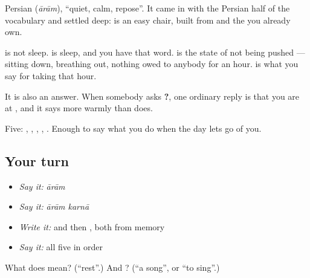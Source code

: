 Persian  (\emph{ārām}), \textquotedblleft{}quiet, calm, repose\textquotedblright{}. It came in with the Persian half of the vocabulary and settled deep: \textbf{} is an easy chair, built from  and the \textbf{} you already own.

 is not sleep. \textbf{} is sleep, and you have that word.  is the state of not being pushed — sitting down, breathing out, nothing owed to anybody for an hour. \textbf{ } is what you say for taking that hour.

It is also an answer. When somebody asks \textbf{  ?}, one ordinary reply is that you are at , and it says more warmly than \textbf{} does.

\begin{grammarlens}[title={What you've built}]
Five: , , , , . Enough to say what you do when the day lets go of you.
\end{grammarlens}

\subsection*{Your turn}
\begin{itemize}
\raggedright
  \item \emph{Say it:} \emph{ārām}
  \item \emph{Say it:} \emph{ārām karnā}
  \item \emph{Write it:}  and then , both from memory
  \item \emph{Say it:} all five in order
\end{itemize}

\begin{tcolorbox}[breakable,colback=teal!4,colframe=teal!35!black,title={Before you move on}]
What does  mean? (\textquotedblleft{}rest\textquotedblright{}.) And ? (\textquotedblleft{}a song\textquotedblright{}, or \textquotedblleft{}to sing\textquotedblright{}.)
\end{tcolorbox}
